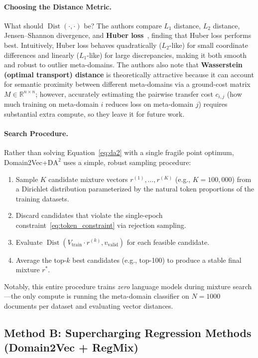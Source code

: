 \documentclass[12pt]{article}
\begin{document}
\paragraph{Choosing the Distance Metric.}
What should $\operatorname{Dist}(\cdot, \cdot)$ be? The authors compare $L_1$ distance, $L_2$ distance, Jensen--Shannon divergence, and \textbf{Huber loss}~\cite{huber1964robust}, finding that Huber loss performs best. Intuitively, Huber loss behaves quadratically ($L_2$-like) for small coordinate differences and linearly ($L_1$-like) for large discrepancies, making it both smooth and robust to outlier meta-domains. The authors also note that \textbf{Wasserstein (optimal transport) distance} is theoretically attractive because it can account for semantic proximity between different meta-domains via a ground-cost matrix $M \in \mathbb{R}^{n \times n}$; however, accurately estimating the pairwise transfer cost $c_{i,j}$ (how much training on meta-domain $i$ reduces loss on meta-domain $j$) requires substantial extra compute, so they leave it for future work.

\paragraph{Search Procedure.}
Rather than solving Equation~\eqref{eq:da2} with a single fragile point optimum, Domain2Vec+$\mathrm{DA}^2$ uses a simple, robust sampling procedure:
\begin{enumerate}
    \item Sample $K$ candidate mixture vectors $r^{(1)}, \dots, r^{(K)}$ (e.g., $K = 100{,}000$) from a Dirichlet distribution parameterized by the natural token proportions of the training datasets.
    \item Discard candidates that violate the single-epoch constraint~\eqref{eq:token_constraint} via rejection sampling.
    \item Evaluate $\operatorname{Dist}(V_{\text{train}} \cdot r^{(k)}, v_{\text{valid}})$ for each feasible candidate.
    \item Average the top-$k$ best candidates (e.g., top-100) to produce a stable final mixture $r^*$.
\end{enumerate}
Notably, this entire procedure trains \emph{zero} language models during mixture search—the only compute is running the meta-domain classifier on $N = 1000$ documents per dataset and evaluating vector distances.

\subsection*{Method B: Supercharging Regression Methods (Domain2Vec + RegMix)}
\end{document}
